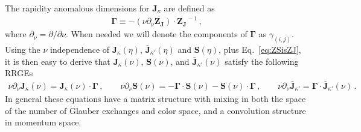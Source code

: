 \documentclass[letterpaper,11pt]{article}
\newcommand{\eq}[1]{Eq.~\eqref{eq:#1}}
\begin{document}
The rapidity anomalous dimensions for $\mathbf{J}_\kappa$ are defined as 
\begin{align}
  \mathbf{\Gamma} \equiv -(\nu \partial_\nu \mathbf{Z_J})\cdot \mathbf{Z_J}^{\!\!\!-1}\,,
\end{align}
where $\partial_\nu = \partial/\partial\nu$. 
When needed we will denote the components of $\mathbf{\Gamma}$ as $\gamma_{(i,j)}$.
Using the $\nu$ independence of $\mathbf{J}_\kappa(\eta)$, $\mathbf{\bar J}_{\kappa'}(\eta)$ and  $\mathbf{S}(\eta)$, plus \eq{ZSisZJ}, it is then easy to derive that $\mathbf{J}_\kappa(\nu)$, $\mathbf{S}(\nu)$, and $\mathbf{\bar J}_{\kappa'}(\nu)$ satisfy the following RRGEs
\begin{align}
  \nu\partial_\nu\mathbf{J}_\kappa(\nu)=\mathbf{J}_\kappa(\nu)\cdot\mathbf{\Gamma}\,,
  \qquad
  \nu\partial_\nu\mathbf{S}(\nu)=-\mathbf{\Gamma}\cdot\mathbf{S}(\nu)-\mathbf{S}(\nu)\cdot\mathbf{\Gamma}\,,
  \qquad
  \nu\partial_\nu \mathbf{\bar J}_{\kappa'} = \mathbf{\Gamma} \cdot \mathbf{\bar J}_{\kappa'}(\nu)
\,.
\end{align}
In general these equations have a matrix structure with mixing in both the space of the number of Glauber exchanges and color space, and a convolution structure in momentum space.
\end{document}
